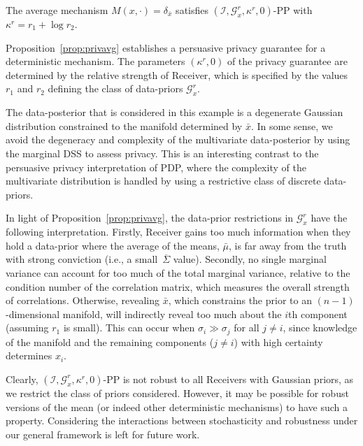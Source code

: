 \documentclass{article}
\theoremstyle{plain}
\theoremstyle{plain}
\theoremstyle{definition}
\theoremstyle{remark}
\theoremstyle{plain}
\begin{document}
\begin{proposition}\label{prop:privavg}
    The average mechanism 
    $M(x,\cdot) = \delta_{\bar{x}}$ satisfies $(\mathcal{I},\mathcal{G}_{x}^{r},\kappa^r,0)$-PP with $\kappa^r = r_1+ \log r_2$.
\end{proposition}
 Proposition~\ref{prop:privavg} establishes a persuasive privacy guarantee for a deterministic mechanism. 
 The parameters $(\kappa^r,0)$ of the privacy guarantee are determined by the relative strength of Receiver, which is specified by the values $r_1$ and $r_2$ defining the class of data-priors $\mathcal{G}_{x}^{r}$.

 The data-posterior that is considered in this example is a degenerate Gaussian distribution constrained to the manifold determined by $\bar{x}$. In some sense, we avoid the degeneracy and complexity of the multivariate data-posterior by using the marginal DSS to assess privacy. This is an interesting contrast to the persuasive privacy interpretation of PDP, where the complexity of the multivariate distribution is handled by using a restrictive class of discrete data-priors. 


In light of Proposition~\ref{prop:privavg}, the data-prior restrictions in $\mathcal{G}_x^r$ have the following interpretation. Firstly, Receiver gains too much information when they hold a data-prior where the average of the means, $\bar{\mu}$, is far away from the truth with strong conviction (i.e., a small~$\overline{\Sigma}$ value). Secondly, no single marginal variance can account for too much of the total marginal variance, relative to the condition number of the correlation matrix, which measures the overall strength of correlations. Otherwise, revealing $\bar{x}$, which constrains the prior to an $(n-1)$-dimensional manifold, will indirectly reveal too much about the $i$th component (assuming $r_1$ is small). This can occur when $\sigma_i \gg \sigma_j$ for all $j \neq i$, since knowledge of the manifold and the remaining components ($j \neq i$) with high certainty determines $x_i$.

Clearly, $(\mathcal{I},\mathcal{G}_x^r,\kappa^r,0)$-PP is not robust to all Receivers with Gaussian priors, as we restrict the class of priors considered. However, it may be possible for robust versions of the mean (or indeed other deterministic mechanisms) to have such a property. Considering the interactions between stochasticity and robustness under our general framework is left for future work.
\end{document}
